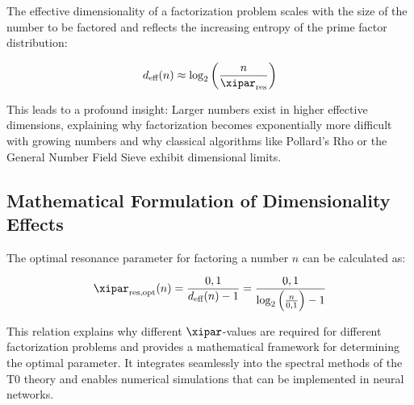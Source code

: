 	The effective dimensionality of a factorization problem scales with the size of the number to be factored and reflects the increasing entropy of the prime factor distribution:
	
	\begin{equation}
		d_{\text{eff}}(n) \approx \log_2\left(\frac{n}{\xipar_{\text{res}}}\right)
	\end{equation}
	
	This leads to a profound insight: Larger numbers exist in higher effective dimensions, explaining why factorization becomes exponentially more difficult with growing numbers and why classical algorithms like Pollard's Rho or the General Number Field Sieve exhibit dimensional limits.
	
	\begin{table}[htbp]
		\centering
		\caption{Effective dimensions and optimal resonance parameters, extended with RSA comparisons}
		\label{tab:effective_dimensions}
	\end{table}
	
	\subsection{Mathematical Formulation of Dimensionality Effects}
	\label{subsec:mathematical_formulation}
	
	The optimal resonance parameter for factoring a number $n$ can be calculated as:
	
	\begin{equation}
		\xipar_{\text{res,opt}}(n) = \frac{0,1}{d_{\text{eff}}(n)-1} = \frac{0,1}{\log_2\left(\frac{n}{0,1}\right)-1}
	\end{equation}
	
	This relation explains why different $\xipar$-values are required for different factorization problems and provides a mathematical framework for determining the optimal parameter. It integrates seamlessly into the spectral methods of the T0 theory and enables numerical simulations that can be implemented in neural networks.
	
